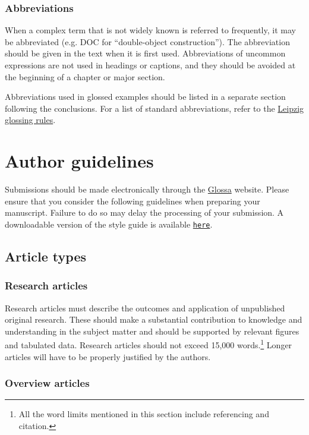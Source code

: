 \documentclass[charis,linguex,biblatex]{glossa}
\begin{document}
\subsubsection{Abbreviations}
When a complex term that is not widely known is referred to frequently, it may be abbreviated (e.g. DOC for ``double-object construction''). The abbreviation should be given in the text when it is first used. Abbreviations of uncommon expressions are not used in headings or captions, and they should be avoided at the beginning of a chapter or major section.

Abbreviations used in glossed examples should be listed in a separate section following the conclusions. For a list of standard abbreviations, refer to the \href{https://www.eva.mpg.de/lingua/resources/glossing-rules.php}{Leipzig glossing rules}. 


\section{Author guidelines}

\sloppy
Submissions should be made electronically through the \href{http://glossa.ubiquitypress.com}{Glossa} website. Please ensure that you consider the following guidelines when preparing your manuscript. Failure to do so may delay the processing of your submission. A downloadable version of the style guide is available \texttt{\href{http://glossa.ubiquitypress.com}{here}}. 

\fussy

\subsection{Article types}

\subsubsection{Research articles}

Research articles must describe the outcomes and application of unpublished original research. These should make a substantial contribution to knowledge and understanding in the subject matter and should be supported by relevant figures and tabulated data. Research articles should not exceed 15,000 words.\footnote{All the word limits mentioned in this section include referencing and citation.} Longer articles will have to be properly justified by the authors.

\subsubsection{Overview articles}
\end{document}
